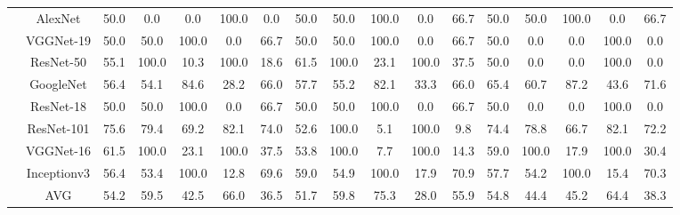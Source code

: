 \documentclass[12pt,italian]{article}
\begin{document}
\begin{tiny}
\begin{longtable}{lcccccccccccccccc}
& AlexNet & 50.0 &  0.0 &  0.0 & 100.0 &  0.0 & 50.0 & 50.0 & 100.0 &  0.0 & 66.7 & 50.0 & 50.0 & 100.0 &  0.0 & 66.7 \\ 
& VGGNet-19 & 50.0 & 50.0 & 100.0 &  0.0 & 66.7 & 50.0 & 50.0 & 100.0 &  0.0 & 66.7 & 50.0 &  0.0 &  0.0 & 100.0 &  0.0 \\ 
& ResNet-50 & 55.1 & 100.0 & 10.3 & 100.0 & 18.6 & 61.5 & 100.0 & 23.1 & 100.0 & 37.5 & 50.0 &  0.0 &  0.0 & 100.0 &  0.0 \\ 
& GoogleNet & 56.4 & 54.1 & 84.6 & 28.2 & 66.0 & 57.7 & 55.2 & 82.1 & 33.3 & 66.0 & 65.4 & 60.7 & 87.2 & 43.6 & 71.6 \\ 
& ResNet-18 & 50.0 & 50.0 & 100.0 &  0.0 & 66.7 & 50.0 & 50.0 & 100.0 &  0.0 & 66.7 & 50.0 &  0.0 &  0.0 & 100.0 &  0.0 \\ 
& ResNet-101 & 75.6 & 79.4 & 69.2 & 82.1 & 74.0 & 52.6 & 100.0 &  5.1 & 100.0 &  9.8 & 74.4 & 78.8 & 66.7 & 82.1 & 72.2 \\ 
& VGGNet-16 & 61.5 & 100.0 & 23.1 & 100.0 & 37.5 & 53.8 & 100.0 &  7.7 & 100.0 & 14.3 & 59.0 & 100.0 & 17.9 & 100.0 & 30.4 \\ 
& Inceptionv3 & 56.4 & 53.4 & 100.0 & 12.8 & 69.6 & 59.0 & 54.9 & 100.0 & 17.9 & 70.9 & 57.7 & 54.2 & 100.0 & 15.4 & 70.3 \\ 
\hline
& AVG & 54.2 & 59.5 & 42.5 & 66.0 & 36.5 & 51.7 & 59.8 & 75.3 & 28.0 & 55.9 & 54.8 & 44.4 & 45.2 & 64.4 & 38.3 \\ 
\hline
\bottomrule
\end{longtable} 

 \pagebreak 
\end{tiny} 
 
\end{document}
